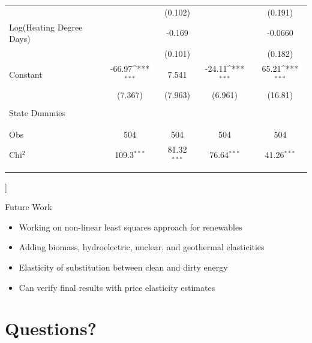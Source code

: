 \documentclass[11pt,aspectratio=169]{beamer}
\def\sym#1{\ifmmode^{#1}\else\(^{#1}\)\fi}
\begin{document}
\begin{frame}
\begin{center}
\begin{table}
\begin{tabular}{l*{4}{c}}
			&                     &     (0.102)         &                     &     (0.191)         \\
			[0.5em]
			Log(Heating Degree Days)      &                     &      -0.169         &                     &     -0.0660         \\
			&                     &     (0.101)         &                     &     (0.182)         \\
			[0.5em]
			Constant      &      -66.97\sym{***}&       7.541         &      -24.11\sym{***}&       65.21\sym{***}\\
			&     (7.367)         &     (7.963)         &     (6.961)         &     (16.81)         \\ \\ [-0.5em] 
			State Dummies &     \checkmark       &    \checkmark     &    \checkmark     &   \checkmark       \\ \\ [-0.5em] 
			\hline \\ [-0.5em] 
			Obs       &         504         &   504                  &            504         &              504       \\
			Chi$^2$        &       109.3$^{***}$         &       81.32$^{***}$         &       76.64$^{***}$         &       41.26$^{***}$         \\\\ [-0.75em] 
			\hline \hline
		\end{tabular}
	\end{table}
\end{center}


]\end{frame}


\begin{frame}{Future Work}

\begin{itemize}
	\setlength\itemsep{1.5em}
	\item Working on non-linear least squares approach for renewables
	
	\item Adding biomass, hydroelectric, nuclear, and geothermal elasticities
	
	\item Elasticity of substitution between clean and dirty energy
	
	\item Can verify final results with price elasticity estimates 
	
\end{itemize}

\end{frame}

\section{Questions?}
\end{document}
